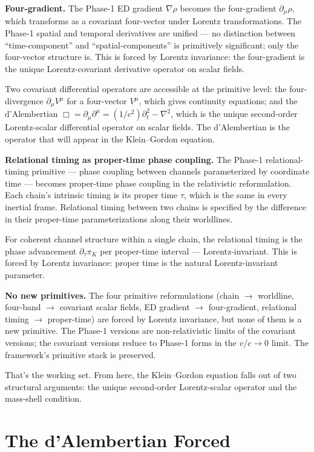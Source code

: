 \documentclass[11pt,a4paper]{article}
\begin{document}
\textbf{Four-gradient.} The Phase-1 ED gradient $\nabla\rho$ becomes the four-gradient $\partial_\mu\rho$, which transforms as a covariant four-vector under Lorentz transformations. The Phase-1 spatial and temporal derivatives are unified --- no distinction between ``time-component'' and ``spatial-components'' is primitively significant; only the four-vector structure is. This is forced by Lorentz invariance: the four-gradient is the unique Lorentz-covariant derivative operator on scalar fields.

Two covariant differential operators are accessible at the primitive level: the four-divergence $\partial_\mu V^\mu$ for a four-vector $V^\mu$, which gives continuity equations; and the d'Alembertian $\Box = \partial_\mu\partial^\mu = (1/c^2)\partial_t^2 - \nabla^2$, which is the unique second-order Lorentz-scalar differential operator on scalar fields. The d'Alembertian is the operator that will appear in the Klein--Gordon equation.

\textbf{Relational timing as proper-time phase coupling.} The Phase-1 relational-timing primitive --- phase coupling between channels parameterized by coordinate time --- becomes proper-time phase coupling in the relativistic reformulation. Each chain's intrinsic timing is its proper time $\tau$, which is the same in every inertial frame. Relational timing between two chains is specified by the difference in their proper-time parameterizations along their worldlines.

For coherent channel structure within a single chain, the relational timing is the phase advancement $\partial_\tau\pi_K$ per proper-time interval --- Lorentz-invariant. This is forced by Lorentz invariance: proper time is the natural Lorentz-invariant parameter.

\textbf{No new primitives.} The four primitive reformulations (chain $\to$ worldline, four-band $\to$ covariant scalar fields, ED gradient $\to$ four-gradient, relational timing $\to$ proper-time) are forced by Lorentz invariance, but none of them is a new primitive. The Phase-1 versions are non-relativistic limits of the covariant versions; the covariant versions reduce to Phase-1 forms in the $v/c \to 0$ limit. The framework's primitive stack is preserved.

That's the working set. From here, the Klein--Gordon equation falls out of two structural arguments: the unique second-order Lorentz-scalar operator and the mass-shell condition.

\section{The d'Alembertian Forced}
\end{document}
